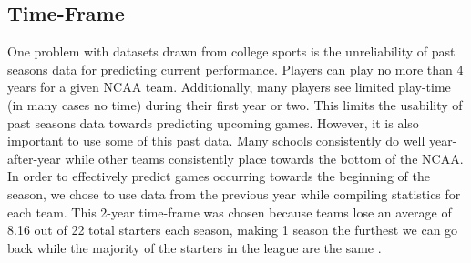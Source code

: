 \documentclass[10pt,twocolumn,letterpaper]{article}
\begin{document}
\subsection{Time-Frame}
One problem with datasets drawn from college sports is the unreliability of past seasons data for predicting current performance.  Players can play no more than 4 years for a given NCAA team.  Additionally, many players see limited play-time (in many cases no time) during their first year or two.  This limits the usability of past seasons data towards predicting upcoming games.  However, it is also important to use some of this past data.  Many schools consistently do well year-after-year while other teams consistently place towards the bottom of the NCAA.  In order to effectively predict games occurring towards the beginning of the season, we chose to use data from the previous year while compiling statistics for each team.  This 2-year time-frame was chosen because teams lose an average of 8.16 out of 22 total starters each season, making 1 season the furthest we can go back while the majority of the starters in the league are the same \cite{starters}.
\end{document}
